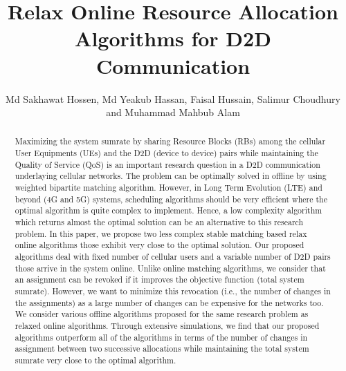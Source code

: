\documentclass[times]{dacauth}
\begin{document}

\title{Relax Online Resource Allocation Algorithms for D2D Communication}

\author{Md Sakhawat Hossen, Md Yeakub Hassan, Faisal Hussain, Salimur Choudhury and Muhammad Mahbub Alam}

\address{Department of Computer Science and Engineering, IUT, Dhaka, Bangladesh and Department of Computer Science, Lakehead University, Thunder Bay, Ontario, Canada}


\begin{abstract}

\noindent 
Maximizing the system sumrate by sharing Resource Blocks (RBs) among the cellular User Equipments (UEs) and the D2D (device to device) pairs while maintaining the Quality of Service (QoS) is an important research question in a D2D communication underlaying cellular networks. The problem can be optimally solved in offline by using weighted bipartite matching algorithm. However, in Long Term Evolution (LTE) and beyond (4G and 5G) systems, scheduling algorithms should be very efficient where the optimal algorithm is quite complex to implement. Hence, a low complexity algorithm which returns almost the optimal solution can be an alternative to this research problem. In this paper, we propose two less complex stable matching based relax online algorithms those exhibit very close to the optimal solution. Our proposed algorithms deal with fixed number of cellular users and a variable number of D2D pairs those arrive in the system online. Unlike online matching algorithms, we consider that an assignment can be revoked if it improves the objective function (total system sumrate). However, we want to minimize this revocation (i.e., the number of changes in the assignments) as a large number of changes can be expensive for the networks too. We consider various offline algorithms proposed for the same research problem as relaxed online algorithms. Through extensive simulations, we find that our proposed algorithms outperform all of the algorithms in terms of the number of changes in assignment between two successive allocations while maintaining the total system sumrate very close to the optimal algorithm.

\end{abstract}

\end{document}
